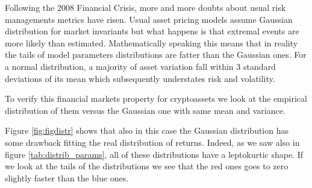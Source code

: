 Following the 2008 Financial Crisis, more and more doubts about usual risk managements metrics have risen. Usual asset pricing models assume Gaussian distribution for market invariants but what happens is that extremal events are more likely than estimated. Mathematically speaking this means that in reality the tails of model parameters distributions are fatter than the Gaussian ones. For a normal distribution, a majority of asset variation fall within 3 standard deviations of its mean which subsequently understates risk and volatility.

To verify this financial markets property for cryptoassets we look at the empirical distribution of them versus the Gaussian one with same mean and variance.

\begin{table}[H]
    \centering
    \label{fig:figdistr}
\end{table}
\bigskip

Figure \ref{fig:figdistr} shows that also in this case the Gaussian distribution has some drawback fitting the real distribution of returns. Indeed, as we saw also in figure \ref{tab:distrib_params}, all of these distributions have a leptokurtic shape. If we look at the tails of the distributions we see that the red ones goes to zero slightly faster than the blue ones.



